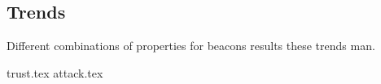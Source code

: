 \subsection{Trends}
\label{sub:trends}
Different combinations of properties for beacons results these trends man.

{trust.tex}
{attack.tex}

